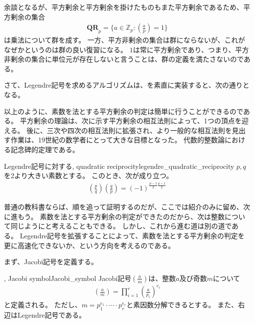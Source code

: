 余談となるが、平方剰余と平方剰余を掛けたものもまた平方剰余であるため、平方剰余の集合
\begin{align*}
\mathbf{QR}_p = \{a \in \mathbb{Z}_p : \left(\frac{a}{p}\right) = 1\}
\end{align*}
は乗法について群を成す。
一方、平方非剰余の集合は群にならないが、これがなぜかというのは群の良い復習になる。
$1$は常に平方剰余であり、つまり、平方非剰余の集合に単位元が存在しないと言うことは、群の定義を満たさないのである。

さて、Legendre記号を求めるアルゴリズムは、を素直に実装すると、次の通りとなる。


以上のように、素数を法とする平方剰余の判定は簡単に行うことができるのである。
平方剰余の理論は、次に示す平方剰余の相互法則によって、1つの頂点を迎える。
後に、三次や四次の相互法則に拡張され、より一般的な相互法則を見出す作業は、19世紀の数学者にとって大きな目標となった。
代数的整数論における記念碑的定理である。

\begin{Theo}{Legendre記号に対する, quadratic reciprocity}{legendre_quadratic_reciprocity}
$p,q$を2より大きい素数とする。
このとき、次が成り立つ。
\begin{align*}
\left(\frac{p}{q}\right)\left(\frac{q}{p}\right) = (-1)^{\frac{p-1}{2}\frac{q-1}{2}}
\end{align*}
\end{Theo}

普通の教科書ならば、順を追って証明するのだが、ここでは紹介のみに留め、次に進もう。
素数を法とする平方剰余の判定ができたのだから、次は整数について同じようにと考えることもできる。
しかし、これから進む道は別の道である。
Legendre記号を拡張することによって、素数を法とする平方剰余の判定を更に高速化できないか、という方向を考えるのである。

まず、Jacobi記号を定義する。

\begin{Defi}{, Jacobi symbol}{Jacobi_symbol}
Jacobi記号$\left(\frac{a}{m}\right)$は、整数$a$及び奇数$m$について
\begin{align*}
\left(\frac{a}{m}\right) = \prod_{i = 1}^r \left(\frac{a}{p_i}\right)^{e_i}
\end{align*}
と定義される。
ただし、$m=p_1^{e_1}\cdot\cdots\cdot p_r^{e_r}$と素因数分解できるとする。
また、右辺はLegendre記号である。
\end{Defi}

